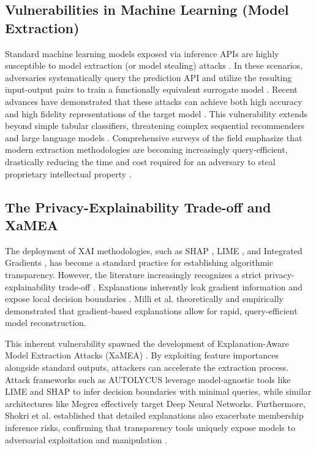 \documentclass[conference]{IEEEtran}
\begin{document}
\subsection{Vulnerabilities in Machine Learning (Model Extraction)}
Standard machine learning models exposed via inference APIs are highly susceptible to model extraction (or model stealing) attacks \cite{b3, b5}. In these scenarios, adversaries systematically query the prediction API and utilize the resulting input-output pairs to train a functionally equivalent surrogate model \cite{b6}. Recent advances have demonstrated that these attacks can achieve both high accuracy and high fidelity representations of the target model \cite{b7}. This vulnerability extends beyond simple tabular classifiers, threatening complex sequential recommenders \cite{b2} and large language models \cite{b29}. Comprehensive surveys of the field emphasize that modern extraction methodologies are becoming increasingly query-efficient, drastically reducing the time and cost required for an adversary to steal proprietary intellectual property \cite{b30}.

\subsection{The Privacy-Explainability Trade-off and XaMEA}
The deployment of XAI methodologies, such as SHAP \cite{b12}, LIME \cite{b13}, and Integrated Gradients \cite{b14}, has become a standard practice for establishing algorithmic transparency. However, the literature increasingly recognizes a strict privacy-explainability trade-off \cite{b4}. Explanations inherently leak gradient information and expose local decision boundaries \cite{b16}. Milli et al. \cite{b8} theoretically and empirically demonstrated that gradient-based explanations allow for rapid, query-efficient model reconstruction. 

This inherent vulnerability spawned the development of Explanation-Aware Model Extraction Attacks (XaMEA) \cite{b1}. By exploiting feature importances alongside standard outputs, attackers can accelerate the extraction process. Attack frameworks such as AUTOLYCUS \cite{b10} leverage model-agnostic tools like LIME and SHAP to infer decision boundaries with minimal queries, while similar architectures like Megrez \cite{b11} effectively target Deep Neural Networks. Furthermore, Shokri et al. \cite{b9} established that detailed explanations also exacerbate membership inference risks, confirming that transparency tools uniquely expose models to adversarial exploitation and manipulation \cite{b15}.
\end{document}

